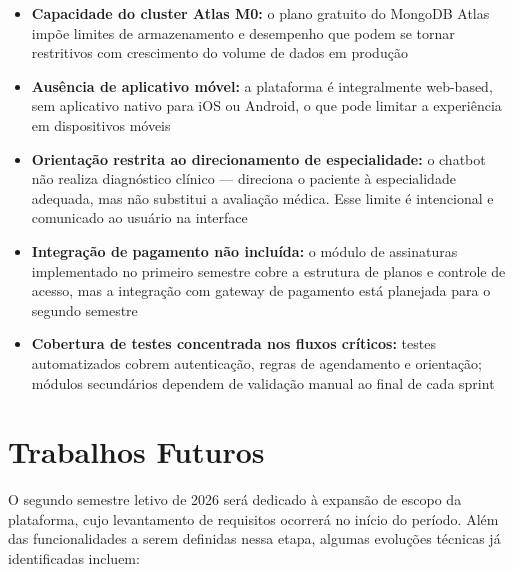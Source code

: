 \begin{itemize}
  \item \textbf{Capacidade do cluster Atlas M0:}
        o plano gratuito do MongoDB Atlas impõe limites
        de armazenamento e desempenho que podem se
        tornar restritivos com crescimento do volume
        de dados em produção

  \item \textbf{Ausência de aplicativo móvel:}
        a plataforma é integralmente web-based, sem
        aplicativo nativo para iOS ou Android, o que
        pode limitar a experiência em dispositivos
        móveis

  \item \textbf{Orientação restrita ao direcionamento
        de especialidade:} o chatbot não realiza
        diagnóstico clínico — direciona o paciente
        à especialidade adequada, mas não substitui
        a avaliação médica. Esse limite é
        intencional e comunicado ao usuário na
        interface

  \item \textbf{Integração de pagamento não incluída:}
        o módulo de assinaturas implementado no
        primeiro semestre cobre a estrutura de planos
        e controle de acesso, mas a integração com
        gateway de pagamento está planejada para o
        segundo semestre

  \item \textbf{Cobertura de testes concentrada nos
        fluxos críticos:} testes automatizados cobrem
        autenticação, regras de agendamento e orientação;
        módulos secundários dependem de validação
        manual ao final de cada sprint
\end{itemize}

\section{Trabalhos Futuros}
\label{sec:future-work}

O segundo semestre letivo de 2026 será dedicado à
expansão de escopo da plataforma, cujo levantamento
de requisitos ocorrerá no início do período. Além
das funcionalidades a serem definidas nessa etapa,
algumas evoluções técnicas já identificadas incluem:

